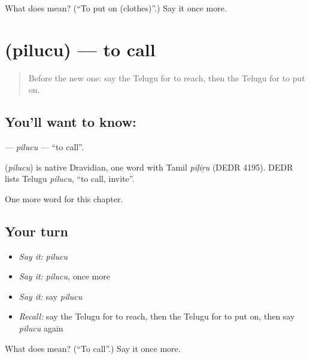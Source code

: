 \begin{tcolorbox}[breakable,colback=teal!4,colframe=teal!35!black,title={Before you move on}]
What does  mean? (\textquotedblleft{}To put on (clothes)\textquotedblright{}.) Say it once more.
\end{tcolorbox}
\section[\texorpdfstring{\te{పిలుచు} (pilucu)}{పిలుచు (pilucu)}]{ (pilucu) — to call}

\label{lesson:TE-C146-pilucu}



\begin{quote}
Before the new one: say the Telugu for to reach, then the Telugu for to put on.
\end{quote}

\subsection*{You'll want to know: }
\textbf{} — \emph{pilucu} — \textquotedblleft{}to call\textquotedblright{}.

\begin{cousinweb}
\textbf{} (\emph{pilucu}) is native Dravidian, one word with Tamil \emph{piḷiṟu} (DEDR 4195). DEDR lists Telugu \emph{pilucu}, \textquotedblleft{}to call, invite\textquotedblright{}.
\end{cousinweb}

\begin{grammarlens}[title={What you've built}]
One more word for this chapter.
\end{grammarlens}

\subsection*{Your turn}
\begin{itemize}
\raggedright
  \item \emph{Say it:} \emph{pilucu}
  \item \emph{Say it:} \emph{pilucu}, once more
  \item \emph{Say it:} say \emph{pilucu}
  \item \emph{Recall:} say the Telugu for to reach, then the Telugu for to put on, then say \emph{pilucu} again
\end{itemize}

\begin{tcolorbox}[breakable,colback=teal!4,colframe=teal!35!black,title={Before you move on}]
What does  mean? (\textquotedblleft{}To call\textquotedblright{}.) Say it once more.
\end{tcolorbox}
